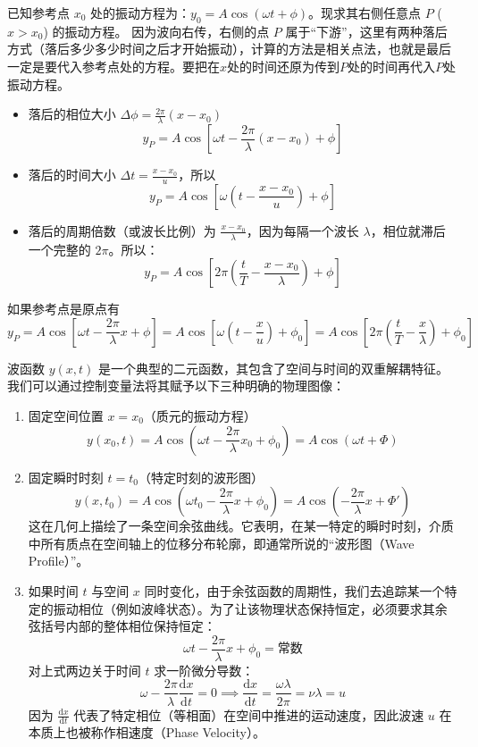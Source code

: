 \documentclass[lang=cn,11pt]{elegantbook}
\begin{document}
\begin{theorem}[平面简谐波函数推导]
已知参考点 $x_0$ 处的振动方程为：$y_0 = A \cos(\omega t + \phi)$。现求其右侧任意点 $P$ ($x > x_0$) 的振动方程。
因为波向右传，右侧的点 $P$ 属于“下游”，这里有两种落后方式（落后多少多少时间之后才开始振动），计算的方法是相关点法，也就是最后一定是要代入参考点处的方程。要把在$x$处的时间还原为传到$P$处的时间再代入$P$处振动方程。
\begin{itemize}
\item 落后的相位大小 $\Delta \phi = \frac{2\pi}{\lambda}(x - x_0)$\[y_P = A \cos \left[ \omega t - \frac{2\pi}{\lambda}(x - x_0) + \phi \right]\]
\item 落后的时间大小 $\Delta t = \frac{x - x_0}{u}$，所以\[y_P = A \cos \left[ \omega \left( t - \frac{x - x_0}{u} \right) + \phi \right]\]
\item 落后的周期倍数（或波长比例）为 $\frac{x - x_0}{\lambda}$，因为每隔一个波长 $\lambda$，相位就滞后一个完整的 $2\pi$。所以：$$\boxed{y_P = A \cos \left[ 2\pi \left( \frac{t}{T} - \frac{x-x_0}{\lambda} \right) + \phi \right]}$$
\end{itemize}
如果参考点是原点有$$y_P = A \cos \left[ \omega t - \frac{2\pi}{\lambda}x + \phi \right]= A \cos \left[ \omega \left( t - \frac{x}{u} \right) + \phi_0 \right]=A \cos \left[ 2\pi \left( \frac{t}{T} - \frac{x}{\lambda} \right) + \phi_0 \right]$$
\end{theorem}
波函数 $y(x,t)$ 是一个典型的二元函数，其包含了空间与时间的双重解耦特征。我们可以通过控制变量法将其赋予以下三种明确的物理图像：
\begin{enumerate}
    \item 固定空间位置 $x = x_0$（质元的振动方程）$$y(x_0, t) = A \cos \left( \omega t - \frac{2\pi}{\lambda}x_0 + \phi_0 \right) = A \cos (\omega t + \Phi)$$
    \item 固定瞬时时刻 $t = t_0$（特定时刻的波形图）$$y(x, t_0) = A \cos \left( \omega t_0 - \frac{2\pi}{\lambda}x + \phi_0 \right) = A \cos \left( -\frac{2\pi}{\lambda}x + \Phi' \right)$$这在几何上描绘了一条空间余弦曲线。它表明，在某一特定的瞬时时刻，介质中所有质点在空间轴上的位移分布轮廓，即通常所说的“波形图（Wave Profile）”。
    \item 如果时间 $t$ 与空间 $x$ 同时变化，由于余弦函数的周期性，我们去追踪某一个特定的振动相位（例如波峰状态）。为了让该物理状态保持恒定，必须要求其余弦括号内部的整体相位保持恒定：$$\omega t - \frac{2\pi}{\lambda}x + \phi_0 = \text{常数}$$对上式两边关于时间 $t$ 求一阶微分导数：$$\omega - \frac{2\pi}{\lambda} \frac{\mathrm{d}x}{\mathrm{d}t} = 0 \implies \frac{\mathrm{d}x}{\mathrm{d}t} = \frac{\omega \lambda}{2\pi} = \nu \lambda = u$$因为 $\frac{\mathrm{d}x}{\mathrm{d}t}$ 代表了特定相位（等相面）在空间中推进的运动速度，因此波速 $u$ 在本质上也被称作相速度（Phase Velocity）。
\end{enumerate}
\end{document}
